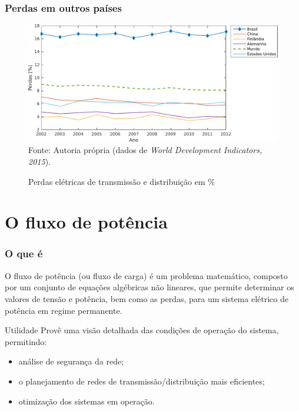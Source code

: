 \documentclass[10pt]{beamer}
\begin{document}
\begin{frame}[fragile]
  \frametitle{Perdas em outros países}
  \begin{figure}
    \centering
    \caption{Perdas elétricas de transmissão e distribuição em \%}
    \includegraphics[width=\textwidth]{img/perdas_mundo}
    \\
    \small Fonte: Autoria própria (dados de \textit{World Development Indicators, 2015}).
    \label{fig:mundo}
  \end{figure}
\end{frame}

\section{O fluxo de potência}

\begin{frame}[fragile]
  \frametitle{O que é}
  \justify
     O fluxo de potência (ou fluxo de carga) é um problema matemático, composto por um conjunto de equações algébricas não lineares, que permite determinar os valores de tensão e potência, bem como as perdas, para um sistema elétrico de potência em regime permanente.

\end{frame}

\begin{frame}{Utilidade}
    \justify
    Provê uma visão detalhada das condições de operação do sistema, permitindo:
    
    \begin{itemize}
        \item análise de segurança da rede;
        
        \item o planejamento de redes de transmissão/distribuição mais eficientes;
        
        \item otimização dos sistemas em operação.
       \end{itemize}
\end{frame}
\end{document}
